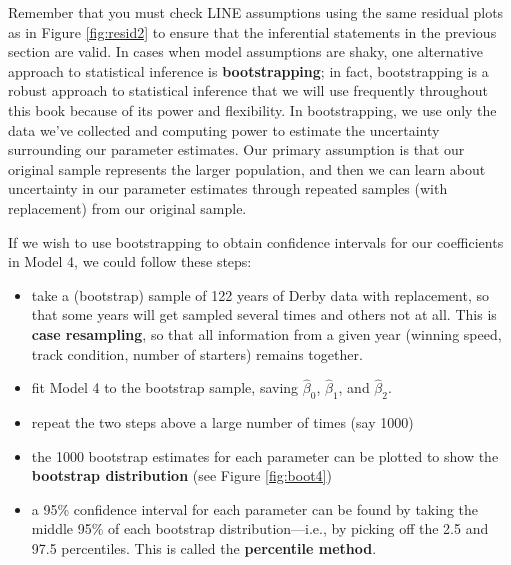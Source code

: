 \documentclass[
]{krantz}
\providecommand{\tightlist}{%
  \setlength{\itemsep}{0pt}\setlength{\parskip}{0pt}}
\begin{document}
Remember that you must check LINE assumptions using the same residual plots as in Figure \ref{fig:resid2} to ensure that the inferential statements in the previous section are valid. In cases when model assumptions are shaky, one alternative approach to statistical inference is \textbf{bootstrapping}; in fact, bootstrapping is a robust approach to statistical inference that we will use frequently throughout this book because of its power and flexibility. In bootstrapping, we use only the data we've collected and computing power to estimate the uncertainty surrounding our parameter estimates. Our primary assumption is that our original sample represents the larger population, and then we can learn about uncertainty in our parameter estimates through repeated samples (with replacement) from our original sample.

If we wish to use bootstrapping to obtain confidence intervals for our coefficients in Model 4, we could follow these steps:

\begin{itemize}
\tightlist
\item
  take a (bootstrap) sample of 122 years of Derby data with replacement, so that some years will get sampled several times and others not at all. This is \textbf{case resampling}, so that all information from a given year (winning speed, track condition, number of starters) remains together.
\item
  fit Model 4 to the bootstrap sample, saving \(\hat{\beta}_0\), \(\hat{\beta}_1\), and \(\hat{\beta}_2\).
\item
  repeat the two steps above a large number of times (say 1000)
\item
  the 1000 bootstrap estimates for each parameter can be plotted to show the \textbf{bootstrap distribution} (see Figure \ref{fig:boot4})
\item
  a 95\% confidence interval for each parameter can be found by taking the middle 95\% of each bootstrap distribution---i.e., by picking off the 2.5 and 97.5 percentiles. This is called the \textbf{percentile method}.
\end{itemize}
\end{document}
